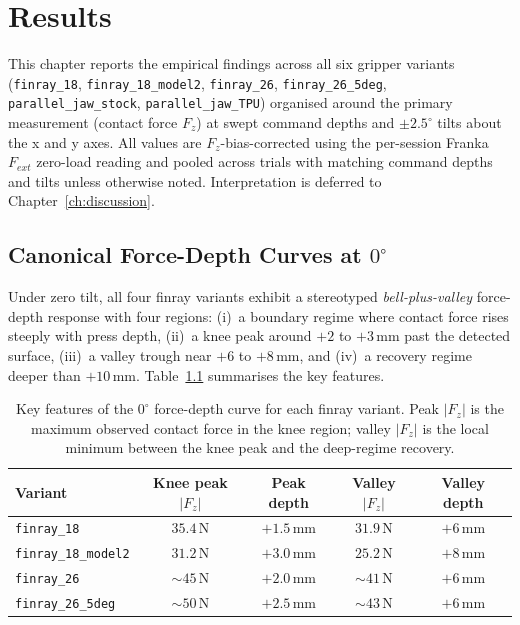 \chapter{\rm\bfseries Results}
\label{ch:results}

This chapter reports the empirical findings across all six gripper
variants (\texttt{finray\_18}, \texttt{finray\_18\_model2},
\texttt{finray\_26}, \texttt{finray\_26\_5deg},
\texttt{parallel\_jaw\_stock}, \texttt{parallel\_jaw\_TPU}) organised
around the primary measurement (contact force $F_z$) at swept command
depths and $\pm 2.5^{\circ}$ tilts about the x and y axes. All values
are $F_z$-bias-corrected using the per-session Franka $F_{ext}$ zero-load
reading and pooled across trials with matching command depths and tilts
unless otherwise noted. Interpretation is deferred to
Chapter~\ref{ch:discussion}.

\section{Canonical Force-Depth Curves at $0^{\circ}$}
\label{sec:zero-tilt-results}

Under zero tilt, all four finray variants exhibit a stereotyped
\emph{bell-plus-valley} force-depth response with four regions:
(i)~a boundary regime where contact force rises steeply with press depth,
(ii)~a knee peak around $+2$ to $+3$\,mm past the detected surface,
(iii)~a valley trough near $+6$ to $+8$\,mm, and (iv)~a recovery regime
deeper than $+10$\,mm. Table~\ref{tab:zero-tilt-summary} summarises the
key features.

\begin{table}[ht]
\centering
\caption[Zero-tilt curve summary]{Key features of the $0^{\circ}$
force-depth curve for each finray variant. Peak $|F_z|$ is the maximum
observed contact force in the knee region; valley $|F_z|$ is the local
minimum between the knee peak and the deep-regime recovery.}
\label{tab:zero-tilt-summary}
\begin{tabular}{lcccc}
\toprule
Variant & Knee peak $|F_z|$ & Peak depth & Valley $|F_z|$ & Valley depth \\
\midrule
\texttt{finray\_18}        & $35.4$\,N & $+1.5$\,mm & $31.9$\,N & $+6$\,mm \\
\texttt{finray\_18\_model2} & $31.2$\,N & $+3.0$\,mm & $25.2$\,N & $+8$\,mm \\
\texttt{finray\_26}        & $\sim 45$\,N & $+2.0$\,mm & $\sim 41$\,N & $+6$\,mm \\
\texttt{finray\_26\_5deg}  & $\sim 50$\,N & $+2.5$\,mm & $\sim 43$\,N & $+6$\,mm \\
\bottomrule
\end{tabular}
\end{table}

